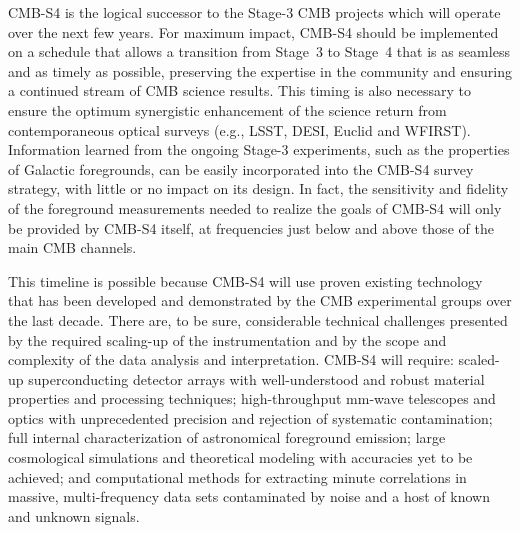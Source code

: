 %


CMB-S4 is the logical successor to the Stage-3 CMB projects which will operate over the next few years. For maximum impact, CMB-S4 should be implemented on a schedule that allows a transition from Stage~3 to Stage~4 that is as seamless and as timely as possible, preserving the expertise in the community and ensuring a continued stream of CMB science results. This timing is also necessary to ensure the optimum synergistic enhancement of the science return from contemporaneous optical surveys (e.g., LSST, DESI, Euclid and WFIRST).   Information learned from the ongoing Stage-3 experiments, such as the properties of Galactic foregrounds, can be easily incorporated into the CMB-S4 survey strategy, with little or no impact on its design. In fact, the sensitivity and fidelity of the foreground measurements needed to realize the goals of CMB-S4 will only be provided by CMB-S4 itself, at frequencies just below and above those of the main CMB channels.

This timeline is possible because CMB-S4 will use proven existing technology that has been developed and demonstrated by the CMB experimental groups over the last decade. There are, to be sure, considerable technical challenges presented by the required scaling-up of the instrumentation and by the scope and complexity of the data analysis and interpretation.  CMB-S4 will require: scaled-up superconducting detector arrays with well-understood and robust material properties and processing techniques; high-throughput mm-wave telescopes and optics with unprecedented precision and rejection of systematic contamination; full internal characterization of astronomical foreground emission; large cosmological simulations and theoretical modeling with accuracies yet to be achieved; and computational methods for extracting minute correlations in massive, multi-frequency data sets contaminated by noise and a host of known and unknown signals. 


